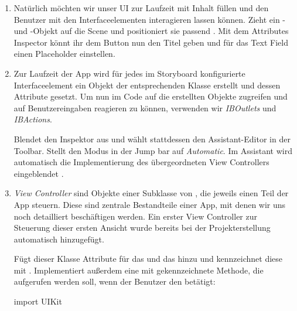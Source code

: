 \documentclass[parskip=half, final]{scrreprt}
\begin{document}
\begin{lecture}
\begin{enumerate}
\item Natürlich möchten wir unser UI zur Laufzeit mit Inhalt füllen und den Benutzer mit den Interfaceelementen interagieren lassen können. Zieht ein - und -Objekt auf die Scene und positioniert sie passend . Mit dem Attributes Inspector könnt ihr dem Button nun den Titel  geben und für das Text Field einen Placeholder  einstellen.


\item Zur Laufzeit der App wird für jedes im Storyboard konfigurierte Interfaceelement ein Objekt der entsprechenden Klasse erstellt und dessen Attribute gesetzt. Um nun im Code auf die erstellten Objekte zugreifen und auf Benutzereingaben reagieren zu können, verwenden wir \emph{IBOutlets} und \emph{IBActions}.
	
	Blendet den Inspektor aus und wählt stattdessen den Assistant-Editor in der Toolbar. Stellt den Modus in der Jump bar auf \emph{Automatic}. Im Assistant wird automatisch die Implementierung des übergeordneten View Controllers eingeblendet .


\item \emph{View Controller} sind Objekte einer Subklasse von , die jeweils einen Teil der App steuern. Diese sind zentrale Bestandteile einer App, mit denen wir uns noch detailliert beschäftigen werden. Ein erster View Controller zur Steuerung dieser ersten Ansicht wurde bereits bei der Projekterstellung automatisch hinzugefügt.

	Fügt dieser Klasse  Attribute für das  und das  hinzu und kennzeichnet diese mit . Implementiert außerdem eine mit  gekennzeichnete Methode, die aufgerufen werden soll, wenn der Benutzer den  betätigt:

\begin{swiftcode}
import UIKit


\end{swiftcode}
\end{enumerate}
\end{lecture}
\end{document}
